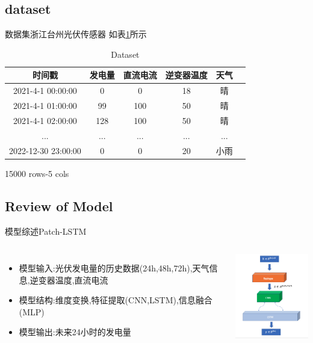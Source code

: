 \documentclass{ctexbeamer}
\begin{document}
\subsection{dataset}
\begin{frame}{数据集}{浙江台州光伏传感器}
如表\ref{tab1}所示
\begin{table}
\centering
\caption{Dataset}
\label{tab1}
\begin{tabular}{cccccc}
\toprule
时间戳 & 发电量 & 直流电流 & 逆变器温度 & 天气  \\
\midrule
2021-4-1 00:00:00 & 0 & 0 & 18 & 晴   \\
2021-4-1 01:00:00 & 99 & 100 & 50 & 晴  \\
2021-4-1 02:00:00 & 128 & 100 & 50 & 晴 \\
...               & ... & ... & ... & ... \\
2022-12-30 23:00:00 & 0 & 0 & 20 & 小雨 \\
\bottomrule
\end{tabular}
\end{table}
15000 rows-5 cols
\end{frame}

\subsection{Review of Model}
\begin{frame}{模型综述}{Patch-LSTM}

    \begin{columns}
        \begin{itemize}
            \item {模型输入:光伏发电量的历史数据(24h,48h,72h),天气信息,逆变器温度,直流电流}
            \item {模型结构:维度变换,特征提取(CNN,LSTM),信息融合(MLP)}
            \item {模型输出:未来24小时的发电量}
        \end{itemize}

            \begin{center}
                \includegraphics[width=4.5cm]{模型架构}
            \end{center}
    \end{columns}
\end{frame}
\end{document}
